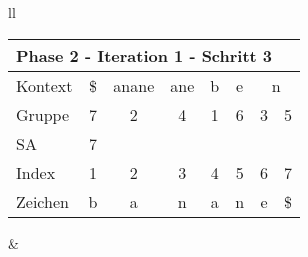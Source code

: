 \begin{table}[H]
\begin{adjustbox}{max width=\textwidth}
\begin{tabular}{ll}
\begin{tabular}{lccccccc}
\multicolumn{8}{l}{Phase 2 - Iteration 1 - Schritt 3}                                                                                                                                                                     \\ \hline
\multicolumn{1}{l|}{Kontext} & \multicolumn{1}{c|}{\cellcolor[HTML]{\green}\$} & \multicolumn{1}{c|}{anane} & \multicolumn{1}{c|}{ane} & \multicolumn{1}{c|}{b} & \multicolumn{1}{c|}{e} & \multicolumn{2}{c}{n} \\
\multicolumn{1}{l|}{Gruppe}  & \multicolumn{1}{c|}{\cellcolor[HTML]{\green}7}  & \multicolumn{1}{c|}{2}     & \multicolumn{1}{c|}{4}   & \multicolumn{1}{c|}{1} & \multicolumn{1}{c|}{6} & 3 & 5                          \\ 
\multicolumn{1}{l|}{SA}      & \multicolumn{1}{c|}{\cellcolor[HTML]{\green}7}  & \multicolumn{1}{c|}{}      & \multicolumn{1}{c|}{}    & \multicolumn{1}{c|}{}  & \multicolumn{1}{c|}{}  &   &                            \\ \hline
\multicolumn{1}{l|}{Index}   & 1                                               & 2                          & 3                        & 4                      & 5                      & \cellcolor[HTML]{\blue}6 & \cellcolor[HTML]{\green}7  \\
\multicolumn{1}{l|}{Zeichen} & b                                               & a                          & n                        & a                      & n                      & \cellcolor[HTML]{\blue}e & \cellcolor[HTML]{\green}\$
\end{tabular}

&


\end{tabular}
\end{adjustbox}
\end{table}
